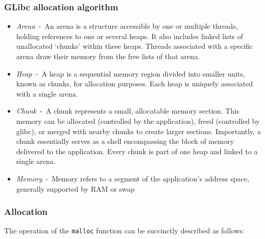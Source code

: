 \documentclass{article}
\begin{document}
\subsubsection{GLibc allocation algorithm}
\begin{itemize}
  \item \emph{Arena}~-~An arena is a structure accessible by one or multiple
threads, holding references to one or several heaps. It also includes linked
lists of unallocated `chunks' within these heaps. Threads associated with a
specific arena draw their memory from the free lists of that arena.
  \item \emph{Heap}~-~A heap is a sequential memory region divided into smaller
units, known as chunks, for allocation purposes. Each heap is uniquely
associated with a single arena.
  \item \emph{Chunk}~-~A chunk represents a small, allocatable memory section.
This memory can be allocated (controlled by the application), freed (controlled
by glibc), or merged with nearby chunks to create larger sections. Importantly,
a chunk essentially serves as a shell encompassing the block of memory delivered
to the application. Every chunk is part of one heap and linked to a single
arena.
  \item \emph{Memory}~-~Memory refers to a segment of the application's address
space, generally supported by RAM or swap
\end{itemize}

\subsubsection{Allocation}
The operation of the \texttt{malloc} function can be succinctly described as
follows:
\end{document}
